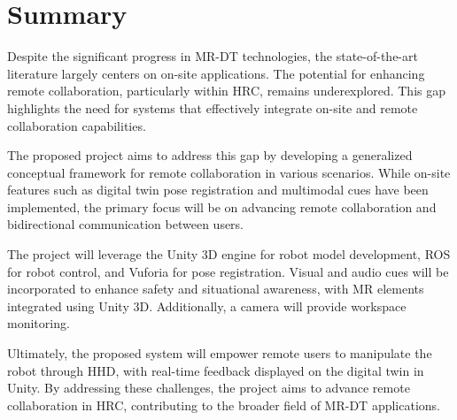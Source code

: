 \section{Summary}

Despite the significant progress in \ac{MR}-\ac{DT} technologies, the state-of-the-art literature largely centers on on-site applications. The potential for enhancing remote collaboration, particularly within \ac{HRC}, remains underexplored. This gap highlights the need for systems that effectively integrate on-site and remote collaboration capabilities.

The proposed project aims to address this gap by developing a generalized conceptual framework for remote collaboration in various scenarios. While on-site features such as digital twin pose registration and multimodal cues have been implemented, the primary focus will be on advancing remote collaboration and bidirectional communication between users.

The project will leverage the Unity 3D engine for robot model development, \ac{ROS} for robot control, and Vuforia for pose registration. Visual and audio cues will be incorporated to enhance safety and situational awareness, with \ac{MR} elements integrated using Unity 3D. Additionally, a camera will provide workspace monitoring.

Ultimately, the proposed system will empower remote users to manipulate the robot through \ac{HHD}, with real-time feedback displayed on the digital twin in Unity. By addressing these challenges, the project aims to advance remote collaboration in \ac{HRC}, contributing to the broader field of \ac{MR}-\ac{DT} applications.





